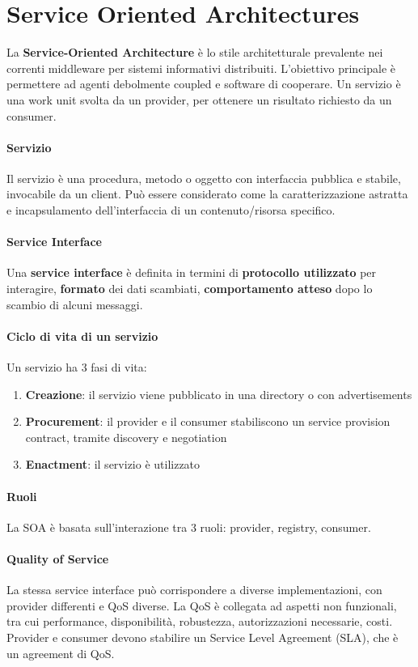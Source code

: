 \documentclass[11pt]{article}
\begin{document}
\section{Service Oriented Architectures}
La \textbf{Service-Oriented Architecture} è lo stile architetturale prevalente nei correnti middleware per sistemi informativi distribuiti.
L'obiettivo principale è permettere ad agenti debolmente coupled e software di cooperare. Un servizio è una work unit svolta da un provider, per ottenere un risultato richiesto da un consumer.
\paragraph{Servizio} Il servizio è una procedura, metodo o oggetto con interfaccia pubblica e stabile, invocabile da un client. Può essere considerato come la caratterizzazione astratta e incapsulamento dell'interfaccia di un contenuto/risorsa specifico.
\paragraph{Service Interface} Una \textbf{service interface} è definita in termini di \textbf{protocollo utilizzato} per interagire, \textbf{formato} dei dati scambiati, \textbf{comportamento atteso} dopo lo scambio di alcuni messaggi.
\paragraph{Ciclo di vita di un servizio} Un servizio ha 3 fasi di vita:
\begin{enumerate}
    \item \textbf{Creazione}: il servizio viene pubblicato in una directory o con advertisements
    \item \textbf{Procurement}: il provider e il consumer stabiliscono un service provision contract, tramite discovery e negotiation
    \item \textbf{Enactment}: il servizio è utilizzato
\end{enumerate}
\paragraph{Ruoli} La SOA è basata sull'interazione tra 3 ruoli: provider, registry, consumer.
\paragraph{Quality of Service} La stessa service interface può corrispondere a diverse implementazioni, con provider differenti e QoS diverse. La QoS è collegata ad aspetti non funzionali, tra cui performance, disponibilità, robustezza, autorizzazioni necessarie, costi. Provider e consumer devono stabilire un Service Level Agreement (SLA), che è un agreement di QoS. 
\end{document}
